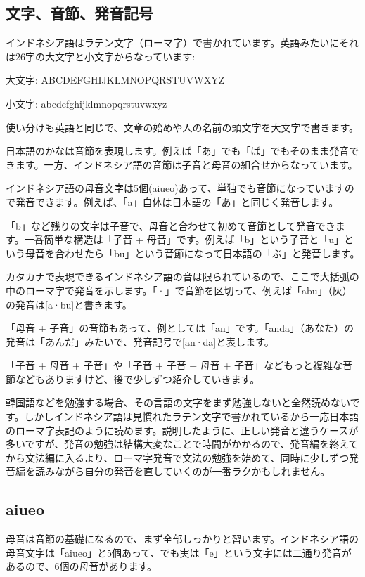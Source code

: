 \documentclass[uplatex]{jsarticle}
\begin{document}
\subsection{文字、音節、発音記号}

インドネシア語はラテン文字（ローマ字）で書かれています。英語みたいにそれは26字の大文字と小文字からなっています:

大文字: ABCDEFGHIJKLMNOPQRSTUVWXYZ

小文字: abcdefghijklmnopqrstuvwxyz

使い分けも英語と同じで、文章の始めや人の名前の頭文字を大文字で書きます。

日本語のかなは音節を表現します。例えば「あ」でも「ば」でもそのまま発音できます。一方、インドネシア語の音節は子音と母音の組合せからなっています。

インドネシア語の母音文字は5個(aiueo)あって、単独でも音節になっていますので発音できます。例えば、「a」自体は日本語の「あ」と同じく発音します。

「b」など残りの文字は子音で、母音と合わせて初めて音節として発音できます。一番簡単な構造は「子音 + 母音」です。例えば「b」という子音と「u」という母音を合わせたら「bu」という音節になって日本語の「ぶ」と発音します。

カタカナで表現できるインドネシア語の音は限られているので、ここで大括弧の中のローマ字で発音を示します。「·」で音節を区切って、例えば「abu」（灰）の発音は[a·bu]と書きます。

「母音 + 子音」の音節もあって、例としては「an」です。「anda」（あなた）の発音は「あんだ」みたいで、発音記号で[an·da]と表します。

「子音 + 母音 + 子音」や「子音 + 子音 + 母音 + 子音」などもっと複雑な音節などもありますけど、後で少しずつ紹介していきます。

韓国語などを勉強する場合、その言語の文字をまず勉強しないと全然読めないです。しかしインドネシア語は見慣れたラテン文字で書かれているから一応日本語のローマ字表記のように読めます。説明したように、正しい発音と違うケースが多いですが、発音の勉強は結構大変なことで時間がかかるので、発音編を終えてから文法編に入るより、ローマ字発音で文法の勉強を始めて、同時に少しずつ発音編を読みながら自分の発音を直していくのが一番ラクかもしれません。

\subsection{aiueo}

母音は音節の基礎になるので、まず全部しっかりと習います。インドネシア語の母音文字は「aiueo」と5個あって、でも実は「e」という文字には二通り発音があるので、6個の母音があります。
\end{document}
